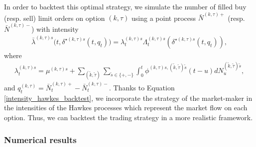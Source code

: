 \documentclass[12pt]{article}
\begin{document}
In order to backtest this optimal strategy, we simulate the number of filled buy (resp. sell) limit orders on option $(k,\tau)$ using a point process $\bar{N}^{(k,\tau)+}$ (resp. $\bar{N}^{(k,\tau)-}$) with intensity 
\begin{align}\label{intensity_hawkes_backtest}
    \bar{\lambda}^{(k,\tau)s}\big(t,\delta^{\star (k,\tau)s}(t,q_t)\big) = \lambda_t^{(k,\tau)s}\Lambda^{(k,\tau)s}_t(\delta^{\star (k,\tau)s}(t,q_t)),
\end{align}
where 
\begin{align*}
    \lambda_t^{(k,\tau)s} = \mu^{(k,\tau)s} + \sum_{(\tilde k,\tilde \tau)}\sum_{\tilde{s}\in \{+,-\}}\int_0^t \phi^{(k,\tau)s,(\tilde k,\tilde \tau)\tilde{s}}(t-u)dN^{(\tilde k,\tilde \tau)\tilde{s}}_u,
\end{align*}
and $q_t^{(k,\tau)} = \bar{N}_t^{(k,\tau)+} - \bar{N}_t^{(k,\tau)-}$. Thanks to Equation \eqref{intensity_hawkes_backtest}, we incorporate the strategy of the market-maker in the intensities of the Hawkes processes which represent the market flow on each option. Thus, we can backtest the trading strategy in a more realistic framework. 

\subsubsection{Numerical results}
\end{document}
